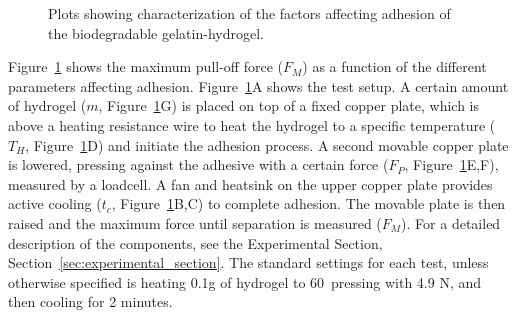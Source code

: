 \begin{figure}
{
}
  \caption{Plots showing characterization of the factors affecting adhesion of the biodegradable gelatin-hydrogel.}
  \label{fig:fig-2-plots-placeholder}

\end{figure}

Figure~\ref{fig:fig-2-plots-placeholder} shows the maximum pull-off force ($F_M$) as a function of the different parameters affecting adhesion. Figure~\ref{fig:fig-2-plots-placeholder}A shows the test setup. A certain amount of hydrogel ($m$, Figure~\ref{fig:fig-2-plots-placeholder}G) is placed on top of a fixed copper plate, which is above a heating resistance wire to heat the hydrogel to a specific temperature ($T_H$, Figure~\ref{fig:fig-2-plots-placeholder}D) and initiate the adhesion process. A second movable copper plate is lowered, pressing against the adhesive with a certain force ($F_P$, Figure~\ref{fig:fig-2-plots-placeholder}E,F), measured by a loadcell. 
A fan and heatsink on the upper copper plate provides active cooling ($t_c$, Figure~\ref{fig:fig-2-plots-placeholder}B,C) to complete adhesion. The movable plate is then raised and the maximum force until separation is measured ($F_M$).  For a detailed description of the components, see the Experimental Section, Section~\ref{sec:experimental_section}.%
 The standard settings for each test, unless otherwise specified is heating 0.1g of hydrogel to 60\degree\, pressing with 4.9 N, and then cooling for 2 minutes.

